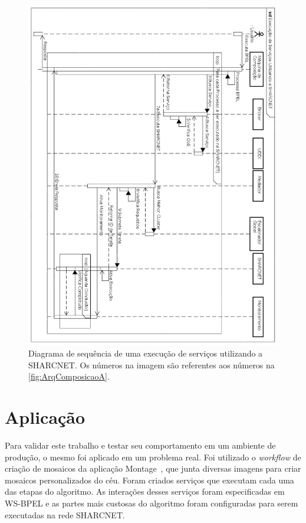 \documentclass[12pt]{report} %
\begin{document}
	\begin{figure}[!htb]%
	    \begin{center}
		\includegraphics[scale=0.55]{imagens/sequencia.pdf} 
		\caption[Diagrama de sequência de uma execução de serviços utilizando a SHARCNET.]{Diagrama de sequência de uma execução de serviços utilizando a SHARCNET. Os números na imagem são referentes aos números na \autoref{fig:ArqComposicaoA}.}
		\label{fig:DiagramaSequencia}
	    \end{center}
	\end{figure}

\chapter{Aplicação}
\label{chap:Aplicacao}
    Para validar este trabalho e testar seu comportamento em um ambiente de produção, o mesmo foi aplicado em um problema real.
    Foi utilizado o \textit{workflow} de criação de mosaicos da aplicação Montage~\cite{Montage:website}, que junta diversas imagens para criar mosaicos personalizados do céu.
    Foram criados serviços que executam cada uma das etapas do algoritmo.
    As interações desses serviços foram especificadas em WS-BPEL e as partes mais custosas do algoritmo foram configuradas para serem executadas na rede SHARCNET.
    
\end{document}
